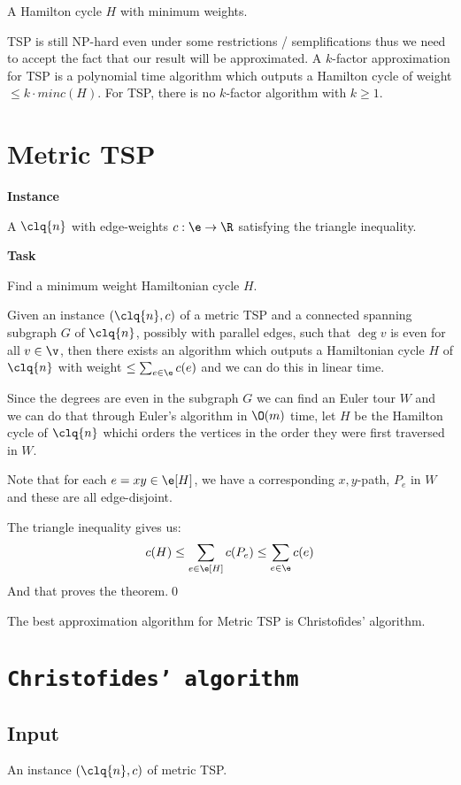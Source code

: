 A Hamilton cycle $H$ with minimum weights.

TSP is still NP-hard even under some restrictions / semplifications thus we need to accept the fact that our result will be approximated. A $k$-factor approximation for TSP is a polynomial time algorithm which outputs a Hamilton cycle of weight $\leq k \cdot min c(H)$. For TSP, there is no $k$-factor algorithm with $k \geq 1$.

\section{Metric TSP}
\textbf{Instance}

A $\clq{n}$ with edge-weights $c: \e \rightarrow \R$ satisfying the triangle inequality.

\textbf{Task}

Find a minimum weight Hamiltonian cycle $H$.

\begin{customlemma}{5.4}
\label{lemma:5.4}
    Given an instance $(\clq{n}, c)$ of a metric TSP and a connected spanning subgraph $G$ of $\clq{n}$, possibly with parallel edges, such that $\deg{v}$ is even for all $v \in \v$, then there exists an algorithm which outputs a Hamiltonian cycle $H$ of $\clq{n}$ with weight $\leq \sum_{e \in \e}c(e)$ and we can do this in linear time.
\end{customlemma}
\begin{prf}
    Since the degrees are even in the subgraph $G$ we can find an Euler tour $W$ and we can do that through Euler's algorithm in $\O(m)$ time, let $H$ be the Hamilton cycle of $\clq{n}$ whichi orders the vertices in the order they were first traversed in $W$.

    Note that for each $e = xy \in \e[H]$, we have a corresponding $x, y$-path, $P_e$ in $W$ and these are all edge-disjoint.

    The triangle inequality gives us:
    \begin{equation*}
        c(H) \leq \sum_{e \in \e[H]}c(P_e) \leq \sum_{e \in \e} c(e)
    \end{equation*}
    And that proves the theorem.\qed
\end{prf}
The best approximation algorithm for Metric TSP is Christofides' algorithm.
\section{\texttt{Christofides' algorithm}}
\subsection{Input}
    An instance $(\clq{n}, c)$ of metric TSP.
